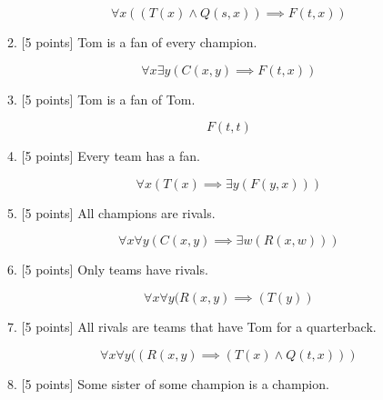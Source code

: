 \documentclass{article}
\begin{document}
\begin{enumerate}
\begin{enumerate}
  \begin{answer}
     \begin{displaymath}
           \forall x ((T(x)\land Q(s,x)) \implies F(t,x))
       \end{displaymath}
\end{answer}
\item {[5 points]} Tom is a fan of every champion.
  \begin{answer}
     \begin{displaymath}
           \forall x \exists y(C(x,y)\implies F(t,x))
       \end{displaymath}
\end{answer}
\item {[5 points]} Tom is a fan of Tom.
  \begin{answer}
     \begin{displaymath}
       F(t,t)
       \end{displaymath}
\end{answer}
\item {[5 points]} Every team has a fan.
  \begin{answer}
     \begin{displaymath}
       \forall x(T(x) \implies \exists y(F(y,x)))
       \end{displaymath}
\end{answer}
\item {[5 points]} All champions are rivals.
  \begin{answer}
     \begin{displaymath}
       \forall x \forall y (C(x,y) \implies \exists w (R(x,w)))
       \end{displaymath}
\end{answer}
\item {[5 points]} Only teams have rivals.
  \begin{answer}
     \begin{displaymath}
   \forall x \forall y(R(x,y)\implies(T(y))
        \end{displaymath}
\end{answer}  
\item {[5 points]} All rivals are teams that have Tom for a quarterback.
  \begin{answer}
     \begin{displaymath}
   \forall x \forall y((R(x,y)\implies(T(x)\land Q(t,x)))
        \end{displaymath}
\end{answer} 
\item {[5 points]} Some sister of some champion is a champion.

\end{enumerate}
\end{enumerate}
\end{document}
